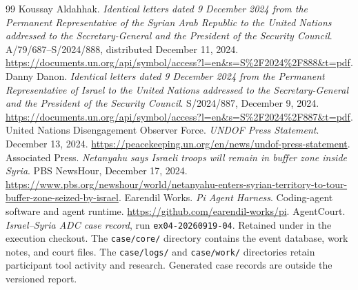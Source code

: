 \documentclass[11pt]{article}
\newcommand{\code}[1]{\texttt{#1}}
\begin{document}
\begin{thebibliography}{99}
 Koussay Aldahhak.  \emph{Identical letters dated 9 December 2024 from the Permanent Representative of the Syrian Arab Republic to the United Nations addressed to the Secretary-General and the President of the Security Council}.  A/79/687--S/2024/888, distributed December 11, 2024.  \url{https://documents.un.org/api/symbol/access?l=en&s=S%2F2024%2F888&t=pdf}.
 Danny Danon.  \emph{Identical letters dated 9 December 2024 from the Permanent Representative of Israel to the United Nations addressed to the Secretary-General and the President of the Security Council}.  S/2024/887, December 9, 2024.  \url{https://documents.un.org/api/symbol/access?l=en&s=S%2F2024%2F887&t=pdf}.
 United Nations Disengagement Observer Force.  \emph{UNDOF Press Statement}.  December 13, 2024.  \url{https://peacekeeping.un.org/en/news/undof-press-statement}.
 Associated Press.  \emph{Netanyahu says Israeli troops will remain in buffer zone inside Syria}.  PBS NewsHour, December 17, 2024.  \url{https://www.pbs.org/newshour/world/netanyahu-enters-syrian-territory-to-tour-buffer-zone-seized-by-israel}.
 Earendil Works.  \emph{Pi Agent Harness}.  Coding-agent software and agent runtime.  \url{https://github.com/earendil-works/pi}.
 AgentCourt.  \emph{Israel--Syria ADC case record}, run \code{ex04-20260919-04}.  Retained under  in the execution checkout.  The \code{case/core/} directory contains the event database, work notes, and court files.  The \code{case/logs/} and \code{case/work/} directories retain participant tool activity and research.  Generated case records are outside the versioned report.
\end{thebibliography}
\end{document}
